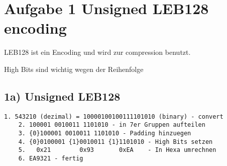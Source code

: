 




\section*{Aufgabe 1 Unsigned LEB128 encoding}

LEB128 ist ein Encoding und wird zur compression benutzt.

High Bits sind wichtig wegen der Reihenfolge

\subsection*{1a) Unsigned LEB128 }

\begin{lstlisting}[]
    1. 543210 (dezimal) = 10000100100111101010 (binary) - convert
    2. 100001 0010011 1101010 - in 7er Gruppen aufteilen
    3. {0}100001 0010011 1101010 - Padding hinzuegen
    4. {0}0100001 {1}0010011 {1}1101010 - High Bits setzen
    5.   0x21        0x93       0xEA    - In Hexa umrechnen
    6. EA9321 - fertig
\end{lstlisting}

